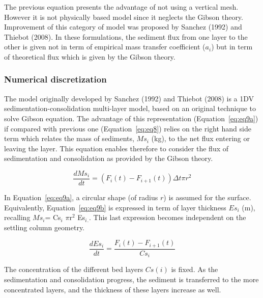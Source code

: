 The previous equation presents the advantage of not using a vertical mesh.
However it is not physically based model since it neglects the Gibson
theory. Improvement of this category of model was proposed by Sanchez (1992)
and Thiebot (2008). In these formulations, the sediment flux from one layer
to the other is given not in term of empirical mass transfer coefficient ($a_i$) 
but in term of theoretical flux which is given by the Gibson theory.

\subsubsection{Numerical discretization}

The model originally developed by Sanchez (1992) and Thiebot
(2008) is a 1DV sedimentation-consolidation multi-layer model, based on an original
technique to solve Gibson equation. The advantage of this representation
(Equation~\ref{eq:eq9a}) if compared with previous one (Equation~\ref{eq:eq8}) relies on the right hand side term
which relates the mass of sediments, $Ms_i$ (kg), to the net flux entering
or leaving the layer. This equation enables therefore to consider the flux
of sedimentation and consolidation as provided by the Gibson theory.

\begin{equation}\label{eq:eq9a}
\dfrac{d Ms_i}{dt} = (F_i(t) - F_{i+1}(t))\Delta t \pi r^2 
\end{equation}%

In Equation~\ref{eq:eq9a}, a circular shape (of radius $r$) is assumed for the surface.
Equivalently, Equation~\ref{eq:eq9b} is expressed in term of layer thickness $Es_i$ (m), 
recalling $Ms_{i}$= Cs$_{i}$ $\pi$r$^{2}$ Es$_{i}$$_{.}$. This
last expression becomes independent on the settling column geometry.

\begin{equation}\label{eq:eq9b}
\dfrac{dEs_i}{dt} = \dfrac{F_i(t) - F_{i+1}(t)}{Cs_i} 
\end{equation}%

The concentration of the different bed layers $Cs(i)$ is fixed. As the
sedimentation and consolidation progress, the sediment is transferred to the
more concentrated layers, and the thickness of these layers increase as well.

